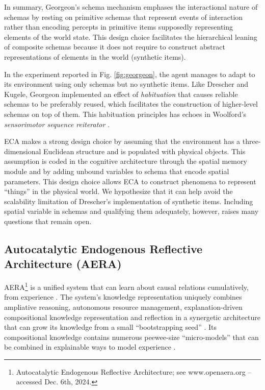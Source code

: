 \documentclass[runningheads]{llncs}
\begin{document}
In summary, Georgeon's schema mechanism emphases the interactional nature of schemas by resting on primitive schemas that represent events of interaction rather than encoding percepts in primitive items supposedly representing elements of the world state. 
This design choice facilitates the hierarchical leaning of composite schemas because it does not require to construct abstract representations of elements in the world (synthetic items).

In the experiment reported in Fig. \ref{fig:georgeon}, the agent manages to adapt to its environment using only schemas but no synthetic items.
Like Drescher and Kugele, Georgeon implemented an effect of \textit{habituation} that causes reliable schemas to be preferably reused, which facilitates the construction of higher-level schemas on top of them. 
This habituation principles has echoes in Woolford's \textit{sensorimotor sequence reiterator} \cite{woolford_precarious_2020}.


ECA makes a strong design choice by assuming that the environment has a three-dimensional Euclidean structure and is populated with physical objects. 
This assumption is coded in the cognitive architecture through the spatial memory module and by adding unbound variables to schema that encode spatial parameters. 
This design choice allows ECA to construct phenomena to represent ``things'' in the physical world. 
We hypothesize that it can help avoid the scalability limitation of Drescher's implementation of synthetic items. 
Including spatial variable in schemas and qualifying them adequately, however, raises many questions that remain open. 






\subsection{Autocatalytic Endogenous Reflective Architecture (AERA)}

AERA\footnote{Autocatalytic Endogenous Reflective Architecture; see www.openaera.org – accessed Dec. 6th, 2024.} is a unified system that can learn about causal relations cumulatively, from experience \cite{thorisson2019cumulative,thorisson2014autonomous,nivel2013autocatalytic}. The system’s knowledge representation uniquely combines ampliative reasoning, autonomous resource management, explanation-driven compositional knowledge representation and reflection in a synergetic architecture that can grow its knowledge from a small “bootstrapping seed” \cite{thorisson2020seed}. Its compositional knowledge contains numerous peewee-size “micro-models” that can be combined in explainable ways to model experience \cite{thorisson2021explanation}. 
\end{document}
